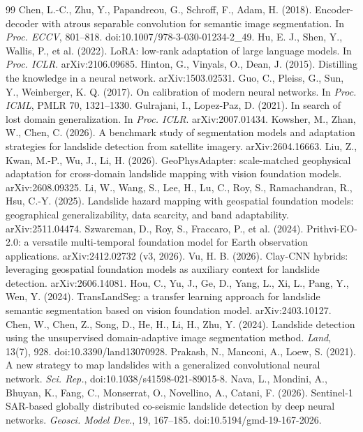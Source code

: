 \begin{thebibliography}{99}
 Chen, L.-C., Zhu, Y., Papandreou, G., Schroff, F., Adam, H. (2018). Encoder-decoder with atrous separable convolution for semantic image segmentation. In \emph{Proc. ECCV}, 801--818. doi:10.1007/978-3-030-01234-2\_49.
 Hu, E. J., Shen, Y., Wallis, P., et al. (2022). LoRA: low-rank adaptation of large language models. In \emph{Proc. ICLR}. arXiv:2106.09685.
 Hinton, G., Vinyals, O., Dean, J. (2015). Distilling the knowledge in a neural network. arXiv:1503.02531.
 Guo, C., Pleiss, G., Sun, Y., Weinberger, K. Q. (2017). On calibration of modern neural networks. In \emph{Proc. ICML}, PMLR 70, 1321--1330.
 Gulrajani, I., Lopez-Paz, D. (2021). In search of lost domain generalization. In \emph{Proc. ICLR}. arXiv:2007.01434.
 Kowsher, M., Zhan, W., Chen, C. (2026). A benchmark study of segmentation models and adaptation strategies for landslide detection from satellite imagery. arXiv:2604.16663.
 Liu, Z., Kwan, M.-P., Wu, J., Li, H. (2026). GeoPhysAdapter: scale-matched geophysical adaptation for cross-domain landslide mapping with vision foundation models. arXiv:2608.09325.
 Li, W., Wang, S., Lee, H., Lu, C., Roy, S., Ramachandran, R., Hsu, C.-Y. (2025). Landslide hazard mapping with geospatial foundation models: geographical generalizability, data scarcity, and band adaptability. arXiv:2511.04474.
 Szwarcman, D., Roy, S., Fraccaro, P., et al. (2024). Prithvi-EO-2.0: a versatile multi-temporal foundation model for Earth observation applications. arXiv:2412.02732 (v3, 2026).
 Vu, H. B. (2026). Clay-CNN hybrids: leveraging geospatial foundation models as auxiliary context for landslide detection. arXiv:2606.14081.
 Hou, C., Yu, J., Ge, D., Yang, L., Xi, L., Pang, Y., Wen, Y. (2024). TransLandSeg: a transfer learning approach for landslide semantic segmentation based on vision foundation model. arXiv:2403.10127.
 Chen, W., Chen, Z., Song, D., He, H., Li, H., Zhu, Y. (2024). Landslide detection using the unsupervised domain-adaptive image segmentation method. \emph{Land}, 13(7), 928. doi:10.3390/land13070928.
 Prakash, N., Manconi, A., Loew, S. (2021). A new strategy to map landslides with a generalized convolutional neural network. \emph{Sci. Rep.}, doi:10.1038/s41598-021-89015-8.
 Nava, L., Mondini, A., Bhuyan, K., Fang, C., Monserrat, O., Novellino, A., Catani, F. (2026). Sentinel-1 SAR-based globally distributed co-seismic landslide detection by deep neural networks. \emph{Geosci. Model Dev.}, 19, 167--185. doi:10.5194/gmd-19-167-2026.

\end{thebibliography}

